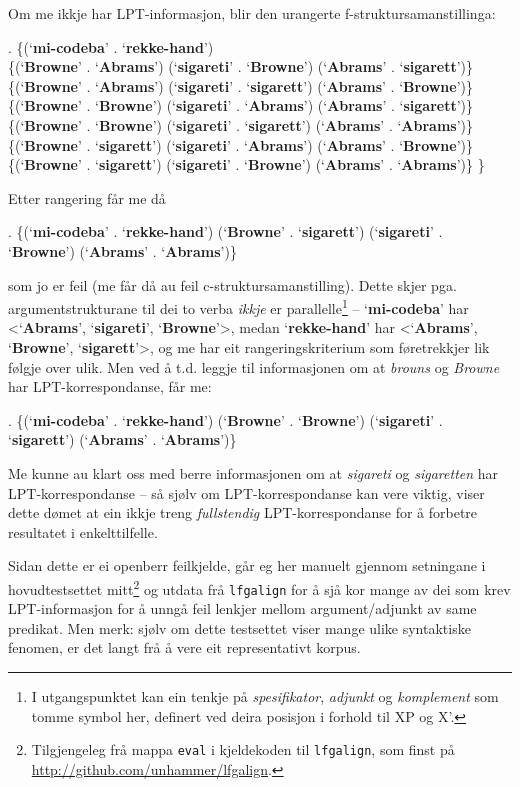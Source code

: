 \documentclass[11pt,a4paper,oneside,draft]{report}
\newcommand{\p}[1]{`\textbf{#1}'}
\begin{document}
 Om me ikkje har LPT-informasjon, blir den urangerte
 f-struktursamanstillinga:

\ex. \{(\p{mi-codeba} . \p{rekke-hand}) \\
 \{(\p{Browne} . \p{Abrams}) (\p{sigareti} . \p{Browne}) (\p{Abrams} . \p{sigarett})\} \\
 \{(\p{Browne} . \p{Abrams}) (\p{sigareti} . \p{sigarett}) (\p{Abrams} . \p{Browne})\} \\
 \{(\p{Browne} . \p{Browne}) (\p{sigareti} . \p{Abrams}) (\p{Abrams} . \p{sigarett})\} \\
 \{(\p{Browne} . \p{Browne}) (\p{sigareti} . \p{sigarett}) (\p{Abrams} . \p{Abrams})\} \\
 \{(\p{Browne} . \p{sigarett}) (\p{sigareti} . \p{Abrams}) (\p{Abrams} . \p{Browne})\} \\
 \{(\p{Browne} . \p{sigarett}) (\p{sigareti} . \p{Browne}) (\p{Abrams} . \p{Abrams})\} \}

 Etter rangering får me då 

\ex. \{(\p{mi-codeba} . \p{rekke-hand}) (\p{Browne} . \p{sigarett}) (\p{sigareti} . \p{Browne}) (\p{Abrams} . \p{Abrams})\} 

 som jo er feil (me får då au feil c-struktursamanstilling). Dette
 skjer pga. argumentstrukturane til dei to verba \emph{ikkje} er
 parallelle\footnote{I utgangspunktet kan ein tenkje på \emph{spesifikator}, \emph{adjunkt}
        og \emph{komplement} som tomme symbol her, definert ved deira
        posisjon i forhold til XP og X'. } -- \p{mi-codeba} har <\p{Abrams}, \p{sigareti},
 \p{Browne}>, medan \p{rekke-hand} har <\p{Abrams}, \p{Browne},
 \p{sigarett}>, og me har eit rangeringskriterium som føretrekkjer lik
 følgje over ulik. Men ved å t.d. leggje til informasjonen om at
 \emph{brouns} og \emph{Browne} har LPT-korrespondanse, får me:

\ex. \{(\p{mi-codeba} . \p{rekke-hand})
 (\p{Browne} . \p{Browne}) (\p{sigareti} . \p{sigarett}) (\p{Abrams} . \p{Abrams})\}

 Me kunne au klart oss med berre informasjonen om at \emph{sigareti} og
 \emph{sigaretten} har LPT-korrespondanse -- så sjølv om LPT-korrespondanse
 kan vere viktig, viser dette dømet at ein ikkje treng \emph{fullstendig}
 LPT-korrespondanse for å forbetre resultatet i enkelttilfelle.

 Sidan dette er ei openberr feilkjelde, går eg her manuelt gjennom
 setningane i hovudtestsettet mitt\footnote{Tilgjengeleg frå mappa \texttt{eval} i kjeldekoden til \texttt{lfgalign},
        som finst på \href{http://github.com/unhammer/lfgalign}{http://github.com/unhammer/lfgalign}. } og utdata frå \texttt{lfgalign} for
 å sjå kor mange av dei som krev LPT-informasjon for å unngå feil
 lenkjer mellom argument/adjunkt av same predikat. Men merk: sjølv om
 dette testsettet viser mange ulike syntaktiske fenomen, er det langt
 frå å vere eit representativt korpus.
\end{document}
